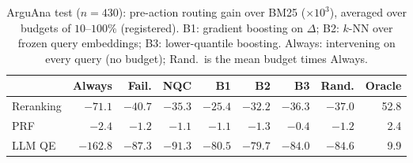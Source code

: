 \begin{table}[t]
\caption{ArguAna test ($n=430$): pre-action routing gain over BM25
($\times10^3$), averaged over budgets of $10$--$100\%$ (registered). B1: gradient
boosting on $\Delta$; B2: $k$-NN over frozen query embeddings; B3:
lower-quantile boosting. Always: intervening on every query (no
budget); Rand.\ is the mean budget times Always.}
\label{tab:arguana}
\footnotesize
\setlength{\tabcolsep}{2.2pt}
\begin{tabular}{@{}lrrrrrrrr@{}}
\toprule
 & Always & Fail. & NQC & B1 & B2 & B3 & Rand. & Oracle \\
\midrule
Reranking & $-71.1$ & $-40.7$ & $-35.3$ & $-25.4$ & $-32.2$ & $-36.3$ & $-37.0$ & 52.8 \\
PRF       & $-2.4$ & $-1.2$ & $-1.1$ & $-1.1$ & $-1.3$ & $-0.4$ & $-1.2$ & 2.4 \\
LLM QE    & $-162.8$ & $-87.3$ & $-91.3$ & $-80.5$ & $-79.7$ & $-84.0$ & $-84.6$ & 9.9 \\
\bottomrule
\end{tabular}
\end{table}
